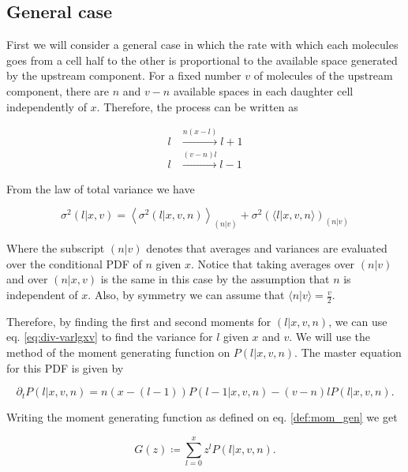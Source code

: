 \subsection{General case}

First we will consider a general case in which the rate with which each molecules goes from a cell half to the other is proportional to the available space generated by the upstream component. For a fixed number $v$ of molecules of the upstream component, there are $n$ and $v-n$ available spaces in each daughter cell independently of $x$. Therefore, the process can be written as

\begin{equation}
  \label{eq:div-arr_disg}
  \begin{split}
    l&\xrightarrow{n(x-l)}l+1\\
    l&\xrightarrow{(v-n)l}l-1
  \end{split}
\end{equation}

From the law of total variance we have

\begin{equation}
  \label{eq:div-varlgxv}
  \sigma^2(l|x,v) = \left\langle\sigma^2(l|x,v,n)\right\rangle_{(n|v)}+\sigma^2\left(\langle l|x,v,n\rangle\right)_{(n|v)}
\end{equation}

Where the subscript $(n|v)$ denotes that averages and variances are evaluated over the conditional PDF of $n$ given $x$. Notice that taking averages over $(n|v)$ and over $(n|x,v)$ is the same in this case by the assumption that $n$ is independent of $x$. Also, by symmetry we can assume that $\langle n|v\rangle = \frac{v}{2}$.

Therefore, by finding the first and second moments for $(l|x,v,n)$, we can use eq. \eqref{eq:div-varlgxv} to find the variance for $l$ given $x$ and $v$. We will use the method of the moment generating function on $P(l|x,v,n)$. The master equation for this PDF is given by

\begin{equation}
  \partial_tP(l|x,v,n) = n(x-(l-1))P(l-1|x,v,n) - (v-n)lP(l|x,v,n).
\end{equation}

Writing the moment generating function as defined on eq. \eqref{def:mom_gen} we get

\begin{equation}
  \label{eq:div-Gdef}
  G(z) \coloneqq \sum_{l=0}^xz^lP(l|x,v,n).
\end{equation}


